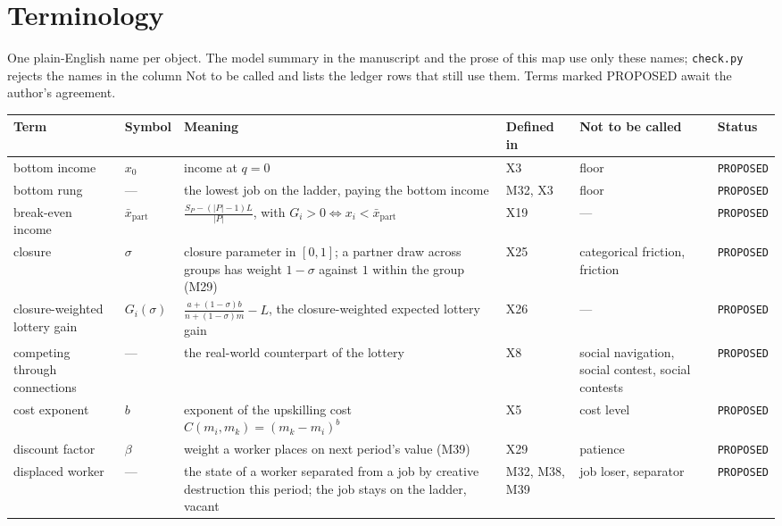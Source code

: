 \documentclass[10pt]{article}
\begin{document}
\section{Terminology}
One plain-English name per object. The model summary in the manuscript and the prose of this map use only these names; \texttt{check.py} rejects the names in the column Not to be called and lists the ledger rows that still use them. Terms marked PROPOSED await the author's agreement.

{\small
\begin{longtable}{>{\raggedright\arraybackslash}p{3.4cm} >{\raggedright\arraybackslash}p{2.6cm} >{\raggedright\arraybackslash}p{7.4cm} >{\raggedright\arraybackslash}p{2.2cm} >{\raggedright\arraybackslash}p{5.0cm} >{\raggedright\arraybackslash}p{2.0cm}}
\toprule Term & Symbol & Meaning & Defined in & Not to be called & Status \\ \midrule \endhead
bottom income & $x_0$ & income at $q=0$ & X3 & floor & \texttt{PROPOSED} \\ \midrule
bottom rung & --- & the lowest job on the ladder, paying the bottom income & M32, X3 & floor & \texttt{PROPOSED} \\ \midrule
break-even income & $\bar x_{\mathrm{part}}$ & $\frac{S_P-(|P|-1)L}{|P|}$, with $G_i>0\iff x_i<\bar x_{\mathrm{part}}$ & X19 & --- & \texttt{PROPOSED} \\ \midrule
closure & $\sigma$ & closure parameter in $[0,1]$; a partner draw across groups has weight $1-\sigma$ against $1$ within the group (M29) & X25 & categorical friction, friction & \texttt{PROPOSED} \\ \midrule
closure-weighted lottery gain & $G_i(\sigma)$ & $\frac{a+(1-\sigma)b}{n+(1-\sigma)m}-L$, the closure-weighted expected lottery gain & X26 & --- & \texttt{PROPOSED} \\ \midrule
competing through connections & --- & the real-world counterpart of the lottery & X8 & social navigation, social contest, social contests & \texttt{PROPOSED} \\ \midrule
cost exponent & $b$ & exponent of the upskilling cost $C(m_i,m_k)=(m_k-m_i)^b$ & X5 & cost level & \texttt{PROPOSED} \\ \midrule
discount factor & $\beta$ & weight a worker places on next period's value (M39) & X29 & patience & \texttt{PROPOSED} \\ \midrule
displaced worker & --- & the state of a worker separated from a job by creative destruction this period; the job stays on the ladder, vacant & M32, M38, M39 & job loser, separator & \texttt{PROPOSED} \\ \midrule

\end{longtable}}
\end{document}
